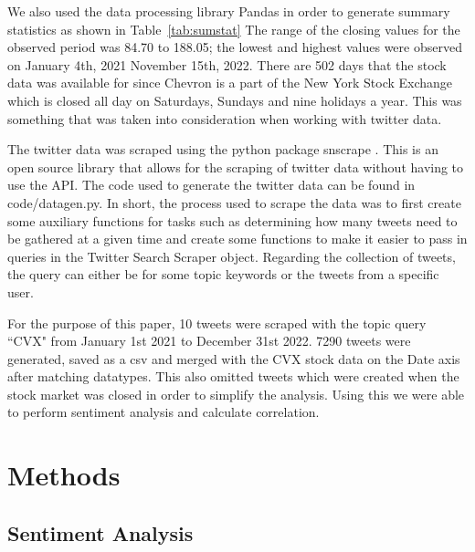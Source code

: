 \documentclass[12pt, letterpaper, titlepage]{article}
\begin{document}
We also used the data processing library Pandas in order to generate summary statistics as shown in Table~\ref{tab:sumstat}
The range of the closing values for the observed period was 84.70 to 188.05; the lowest and highest values were observed on January 4th, 2021 November 15th, 2022. There are 502 days that the stock data was available for since Chevron is a part of the New York Stock Exchange which is closed all day on Saturdays, Sundays and nine holidays a year. This was something that was taken into consideration when working with twitter data. 


The twitter data was scraped using the python package snscrape \citep{justanotherarchivist_2022}. This is an open source library that allows for the scraping of twitter data without having to use the API. The code used to generate the twitter data can be found in code/datagen.py. In short, the process used to scrape the data was to first create some auxiliary functions for tasks such as determining how many tweets need to be gathered at a given time and create some functions to make it easier to pass in queries in the Twitter Search Scraper object. Regarding the collection of tweets, the query can either be for some topic keywords or the tweets from a specific user. 


For the purpose of this paper, 10 tweets were scraped with the topic query ``CVX" from January 1st 2021 to December 31st 2022.  7290 tweets were generated, saved as a csv and merged with the CVX stock data on the Date axis after matching datatypes. This also omitted tweets which were created when the stock market was closed in order to simplify the analysis. Using this we were able to perform sentiment analysis and calculate correlation.


\label{sec: methods}
\section{Methods}

\subsection{Sentiment Analysis}
\end{document}
